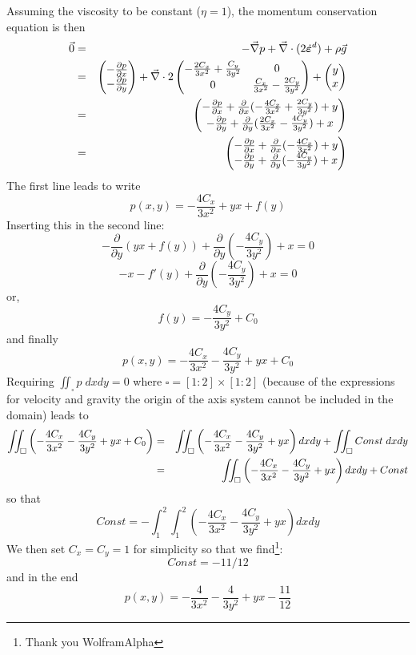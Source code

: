Assuming the viscosity to be constant ($\eta=1$), the momentum conservation equation is then
\begin{eqnarray}
\vec{0}&=& -\vec\nabla p + \vec\nabla \cdot (2  \dot{\bm \varepsilon}^d )+ \rho \vec{g} \nonumber\\
&=& 
\begin{pmatrix} 
-\frac{\partial p}{\partial x} \\
-\frac{\partial p}{\partial y} 
\end{pmatrix} 
+    \vec\nabla \cdot  2 
\begin{pmatrix}
-\frac{2C_x}{3x^2} + \frac{C_y}{3y^2} & 0 \\
0 & \frac{C_x}{3x^2} - \frac{2C_y}{3y^2}
\end{pmatrix}
+ 
\begin{pmatrix}
 y \\ x
\end{pmatrix} \nonumber\\
&=&
\begin{pmatrix} 
-\frac{\partial p}{\partial x} +  \frac{\partial}{\partial x} (-\frac{4C_x}{3x^2} +\frac{2C_y}{3y^2})+ y \\
-\frac{\partial p}{\partial y} +  \frac{\partial}{\partial y} (\frac{2C_x}{3x^2} -\frac{4C_y}{3y^2})+ x 
\end{pmatrix} \nonumber\\
&=& 
\begin{pmatrix} 
-\frac{\partial p}{\partial x} +  \frac{\partial}{\partial x} (-\frac{4C_x}{3x^2})+ y \\
-\frac{\partial p}{\partial y} +  \frac{\partial}{\partial y} (-\frac{4C_y}{3y^2})+ x 
\end{pmatrix} 
\end{eqnarray}
The first line leads to write 
\[
p(x,y) = -\frac{4 C_x}{3x^2}   + yx + f(y)
\]
Inserting this in the second line:
\[
-\frac{\partial }{\partial y}  \left(  yx + f(y) \right) 
+  \frac{\partial}{\partial y} \left(-\frac{4C_y}{3y^2} \right)+ x = 0
\]
\[
-x - f'(y) +  \frac{\partial}{\partial y} \left(-\frac{4C_y}{3y^2} \right)+ x = 0
\]
or, 
\[
f(y) =   -\frac{4  C_y}{3y^2} + C_0
\]
and finally
\[
p(x,y) =  -\frac{4  C_x}{3x^2}  -\frac{4 C_y}{3y^2}   + yx    + C_0
\]
Requiring $\iint_\square p \; dxdy=0$ where $\square=[1:2]\times [1:2]$ (because of the 
expressions for velocity and gravity the origin of the axis system cannot be included in the 
domain) leads to 
\begin{eqnarray}
\iint_\square  
\left( -\frac{4  C_x}{3x^2}  -\frac{4  C_y}{3y^2}   + yx    + C_0 \right) 
&=& 
\iint_\square   \left( -\frac{4  C_x}{3x^2}  -\frac{4 C_y}{3y^2}   + yx  \right) dxdy
+\iint_\square   Const \; dx dy \nonumber\\
&=&\iint_\square   \left( -\frac{4  C_x}{3x^2}  -\frac{4  C_y}{3y^2}   + yx  \right) dxdy
+ Const
\end{eqnarray}
so that 
\[
Const = -\int_1^2 \int_1^2  \left( -\frac{4  C_x}{3x^2}  -\frac{4  C_y}{3y^2}   + yx  \right) dxdy
\]
We then set $C_x=C_y=1$ for simplicity so that we find\footnote{Thank you WolframAlpha}:
\[
Const= -11/12
\]
and in the end
\[
p(x,y) = -\frac{4}{3x^2} -\frac{4}{3y^2} + yx -\frac{11}{12}
\]

